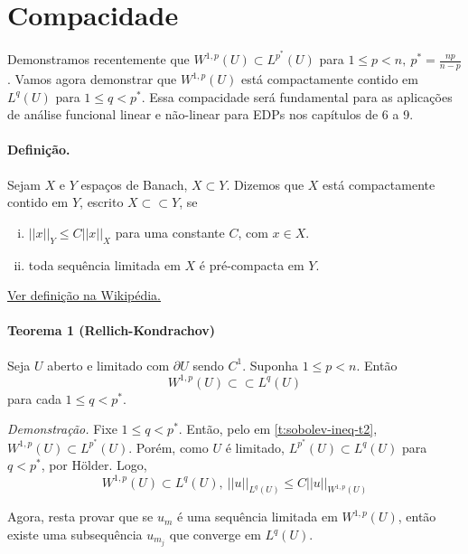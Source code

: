 \documentclass[11pt]{article}
\begin{document}
\section{Compacidade}

Demonstramos recentemente que $W^{1,p}(U) \subset L^{p^*}(U)$ para $1 \leq p < n,\ p^* = \frac{np}{n-p}$. Vamos agora demonstrar que $W^{1,p}(U)$ está compactamente contido em $L^q(U)$ para $1 \leq q < p^*$. Essa compacidade será fundamental para as aplicações de análise funcional linear e não-linear para EDPs nos capítulos de 6 a 9.

\paragraph{Definição.} Sejam $X$ e $Y$ espaços de Banach, $X \subset Y$. Dizemos que $X$ está compactamente contido em $Y$, escrito $X \subset \subset Y$, se \begin{enumerate}[(i)]
	\item $ ||x||_Y \leq C ||x||_X $ para uma constante $C$, com $x \in X$.
	\item toda sequência limitada em $X$ é pré-compacta em $Y$.
\end{enumerate}
\href{https://en.wikipedia.org/wiki/Compact\_embedding}{Ver definição na Wikipédia.}

\paragraph{Teorema 1 (Rellich-Kondrachov)}\label{t:sobolev-compact} Seja \(U\) aberto e limitado com \(\partial U\) sendo \( C^1 \). Suponha \(1\leq p < n\). Então \[ W^{1,p}(U) \subset\subset L^q(U) \] para cada \(1 \leq q < p^* \).

\textit{Demonstração.} Fixe $1 \leq q < p^*$. Então, pelo  em \ref{t:sobolev-ineq-t2}, $W^{1,p}(U) \subset L^{p^*}(U)$. Porém, como $U$ é limitado, $L^{p^*}(U) \subset L^q(U)$ para $q<p^*$, por Hölder. Logo, \[ W^{1,p}(U) \subset L^q(U), \ ||u||_{L^q(U)} \leq C ||u||_{W^{1,p}(U)} \] 

Agora, resta provar que se $u_m$ é uma sequência limitada em $W^{1,p}(U)$, então existe uma subsequência $u_{m_j}$ que converge em $L^q(U)$.
\end{document}
